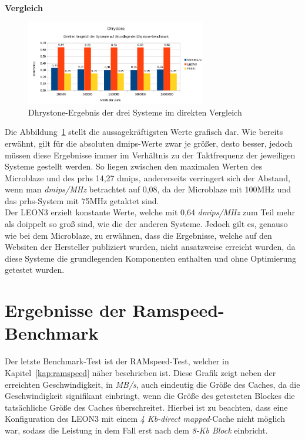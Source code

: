 \textbf{Vergleich}


\begin{figure}[H]
\centering
\includegraphics[width=0.7\textwidth]{Hauptteil/dhrystoneresult.png}
\caption{Dhrystone-Ergebnis der drei Systeme im direkten Vergleich}
\label{fig:dhrystoneresult}
\end{figure}

Die Abbildung~\ref{fig:dhrystoneresult} stellt die aussagekräftigsten Werte grafisch dar. Wie bereits erwähnt, gilt für die absoluten \ac{dmips}-Werte zwar je größer, desto besser, jedoch müssen diese
Ergebnisse immer im Verhältnis zu der Taktfrequenz der jeweiligen Systeme gestellt werden. So liegen zwischen den maximalen Werten des Microblaze und des \ac{prhs} 14,27 \ac{dmips}, andererseits
verringert sich der Abstand, wenn man \emph{\ac{dmips}/MHz} betrachtet auf 0,08, da der Microblaze mit 100MHz und das \ac{prhs}-System mit 75MHz getaktet sind.\\
Der LEON3 erzielt konstante Werte, welche mit 0,64 \emph{\ac{dmips}/MHz} zum Teil mehr als doippelt so groß sind, wie die der anderen Systeme. Jedoch gilt es, genauso wie bei dem Microblaze,
zu erwähnen, dass die Ergebnisse, welche auf den Websiten der Hersteller publiziert wurden, nicht ansatzweise erreicht wurden, da diese Systeme die grundlegenden Komponenten enthalten
und ohne Optimierung getestet wurden.\\

\section{Ergebnisse der Ramspeed-Benchmark}\label{kap:ramspeedtest}
Der letzte Benchmark-Test ist der RAMspeed-Test, welcher in Kapitel~\ref{kap:ramspeed} näher beschrieben ist. Diese Grafik zeigt neben der
erreichten Geschwindigkeit, in \emph{MB/s}, auch eindeutig die Größe des Caches, da die Geschwindigkeit signifikant einbringt, wenn die Größe des getesteten Blockes die tatsächliche Größe
des Caches überschreitet. Hierbei ist zu beachten, dass eine Konfiguration des LEON3 mit einem \emph{4 Kb-direct mapped}-Cache nicht möglich war, sodass die Leistung in dem Fall erst nach dem
\emph{8-Kb Block} einbricht.\\

